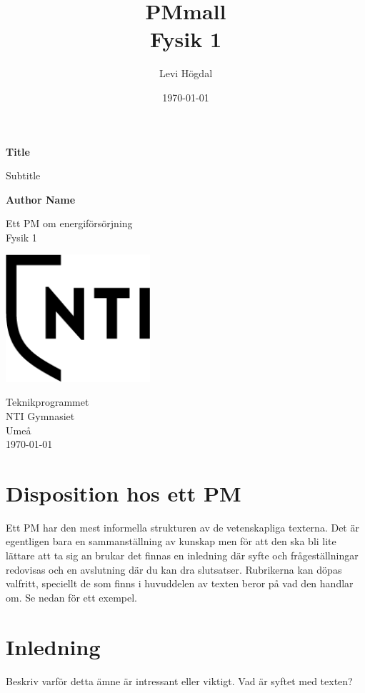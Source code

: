 \documentclass[11p]{article}
\title{PMmall \\ \small Fysik 1}
\author{Levi Högdal }
\date{\today}
\begin{document}
 \begin{titlepage}
  \begin{center}
   \vspace*{1cm}

   \Huge
   \textbf{Title}

   \vspace{0.5cm}
   \LARGE
   Subtitle

   \vspace{1.5cm}

   \textbf{Author Name}

   \vfill

   Ett PM om energiförsörjning \\
   Fysik 1

   \vspace{0.8cm}

   \includegraphics[width=0.4\textwidth]{NTI Gymnasiet_Symbol_print_svart.png}

   \Large
   Teknikprogrammet\\
   NTI Gymnasiet\\
   Umeå\\
   \today

  \end{center}
 \end{titlepage}
 \tableofcontents
 \newpage
 \section{Disposition hos ett PM}
 Ett PM har den mest informella strukturen av de vetenskapliga texterna. Det är egentligen bara en sammanställning av kunskap men för att den ska bli lite lättare att ta sig an brukar det finnas en inledning där syfte och frågeställningar redovisas och en avslutning där du kan dra slutsatser. Rubrikerna kan döpas valfritt, speciellt de som finns i huvuddelen av texten beror på vad den handlar om. Se nedan för ett exempel.

 \section{Inledning}
 Beskriv varför detta ämne är intressant eller viktigt. Vad är syftet med texten?
\end{document}
